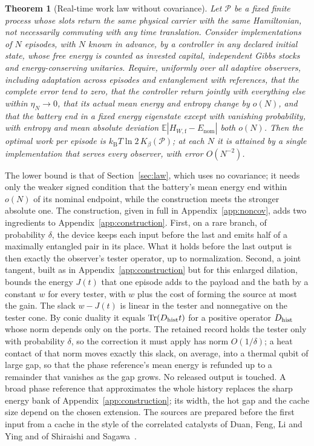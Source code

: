 \documentclass[11pt]{article}
\newtheorem{theorem}{Theorem}
\theoremstyle{definition}
\theoremstyle{remark}
\newcommand{\Tr}{\operatorname{Tr}}
\newcommand{\kB}{k_{\mathrm B}}
\newcommand{\Kb}{K_\beta}
\newcommand{\Pp}{\mathcal P}
\begin{document}
\begin{theorem}[Real-time work law without covariance]\label{thm:noncov}
Let $\Pp$ be a fixed finite process whose slots return the same physical carrier with the same Hamiltonian, not necessarily commuting with any time translation. Consider implementations of $N$ episodes, with $N$ known in advance, by a controller in any declared initial state, whose free energy is counted as invested capital, independent Gibbs stocks and energy-conserving unitaries. Require, uniformly over all adaptive observers, including adaptation across episodes and entanglement with references, that the complete error tend to zero, that the controller return jointly with everything else within $\eta_N\to0$, that its actual mean energy and entropy change by $o(N)$, and that the battery end in a fixed energy eigenstate except with vanishing probability, with entropy and mean absolute deviation $\mathbb E|H_{W,\mathrm f}-E_{\mathrm{nom}}|$ both $o(N)$. Then the optimal work per episode is $\kB T\ln2\,\Kb(\Pp)$; at each $N$ it is attained by a single implementation that serves every observer, with error $O(N^{-2})$.
\end{theorem}

The lower bound is that of Section~\ref{sec:law}, which uses no covariance; it needs only the weaker signed condition that the battery's mean energy end within $o(N)$ of its nominal endpoint, while the construction meets the stronger absolute one. The construction, given in full in Appendix~\ref{app:noncov}, adds two ingredients to Appendix~\ref{app:construction}. First, on a rare branch, of probability $\delta$, the device keeps each input before the last and emits half of a maximally entangled pair in its place. What it holds before the last output is then exactly the observer's tester operator, up to normalization. Second, a joint tangent, built as in Appendix~\ref{app:construction} but for this enlarged dilation, bounds the energy $J(t)$ that one episode adds to the payload and the bath by a constant $w$ for every tester, with $w$ plus the cost of forming the source at most the gain. The slack $w-J(t)$ is linear in the tester and nonnegative on the tester cone. By conic duality it equals $\Tr(D_{\rm hist}t)$ for a positive operator $D_{\rm hist}$ whose norm depends only on the ports. The retained record holds the tester only with probability $\delta$, so the correction it must apply has norm $O(1/\delta)$; a heat contact of that norm moves exactly this slack, on average, into a thermal qubit of large gap, so that the phase reference's mean energy is refunded up to a remainder that vanishes as the gap grows. No released output is touched. A broad phase reference that approximates the whole history replaces the sharp energy bank of Appendix~\ref{app:construction}; its width, the hot gap and the cache size depend on the chosen extension. The sources are prepared before the first input from a cache in the style of the correlated catalysts of Duan, Feng, Li and Ying and of Shiraishi and Sagawa~\cite{Duan05,ShiraishiSagawa21}.
\end{document}
